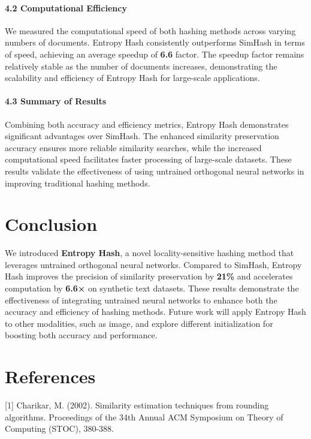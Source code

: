 \documentclass{article}
\begin{document}
\paragraph{\textbf{4.2 Computational Efficiency}}

We measured the computational speed of both hashing methods across varying numbers of documents. 
Entropy Hash consistently outperforms SimHash in terms of speed, achieving an average speedup of \textbf{6.6} factor. The speedup factor remains relatively stable as the number of documents increases, demonstrating the scalability and efficiency of Entropy Hash for large-scale applications.

\paragraph{\textbf{4.3 Summary of Results}}

Combining both accuracy and efficiency metrics, Entropy Hash demonstrates significant advantages over SimHash. The enhanced similarity preservation accuracy ensures more reliable similarity searches, while the increased computational speed facilitates faster processing of large-scale datasets. These results validate the effectiveness of using untrained orthogonal neural networks in improving traditional hashing methods.


\section{Conclusion}
\label{sec:headings}

We introduced \textbf{Entropy Hash}, a novel locality-sensitive hashing method that leverages untrained orthogonal neural networks. Compared to SimHash, Entropy Hash improves the precision of similarity preservation by \textbf{ 21\%} and accelerates computation by \textbf{6.6×} on synthetic text datasets. These results demonstrate the effectiveness of integrating untrained neural networks to enhance both the accuracy and efficiency of hashing methods. Future work will apply Entropy Hash to other modalities, such as image, and explore different initialization for boosting both accuracy and performance.

\section{References}
\label{sec:headings}

[1] Charikar, M. (2002). Similarity estimation techniques from rounding algorithms. Proceedings of the 34th Annual ACM Symposium on Theory of Computing (STOC), 380-388.
\end{document}
